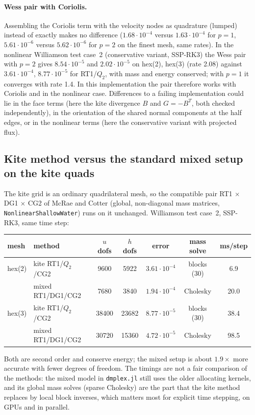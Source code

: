 \documentclass[11pt,a4paper]{article}
\newcommand{\code}[1]{\texttt{#1}}
\begin{document}
\paragraph{Wess pair with Coriolis.} Assembling the Coriolis term with the velocity
nodes as quadrature (lumped) instead of exactly makes no difference
($1.68\cdot10^{-4}$ versus $1.63\cdot10^{-4}$ for $p=1$, $5.61\cdot10^{-6}$ versus
$5.62\cdot10^{-6}$ for $p=2$ on the finest mesh, same rates). In the nonlinear
Williamson test case~2 (conservative variant, SSP-RK3) the Wess pair with $p=2$
gives $8.54\cdot10^{-5}$ and $2.02\cdot10^{-5}$ on hex(2), hex(3) (rate 2.08)
against $3.61\cdot10^{-4}$, $8.77\cdot10^{-5}$ for RT1/$Q_2$, with mass and energy
conserved; with $p=1$ it converges with rate 1.4. In this implementation the pair
therefore works with Coriolis and in the nonlinear case. Differences to a failing
implementation could lie in the face terms (here the kite divergence $B$ and
$G=-B^T$, both checked independently), in the orientation of the shared normal
components at the half edges, or in the nonlinear terms (here the conservative
variant with projected flux).

\subsection{Kite method versus the standard mixed setup on the kite quads}
The kite grid is an ordinary quadrilateral mesh, so the compatible pair
RT1 $\times$ DG1 $\times$ CG2 of McRae and Cotter (global, non-diagonal mass
matrices, \code{NonlinearShallowWater}) runs on it unchanged. Williamson test
case~2, SSP-RK3, same time step:
\begin{center}
\begin{tabular}{llccccc}
\toprule
mesh & method & $u$ dofs & $h$ dofs & error & mass solve & ms/step \\
\midrule
hex(2) & kite RT1/$Q_2$/CG2   &  9600 &  5922 & $3.61\cdot10^{-4}$ & blocks (30) & 6.9 \\
       & mixed RT1/DG1/CG2    &  7680 &  3840 & $1.94\cdot10^{-4}$ & Cholesky    & 20.0 \\
hex(3) & kite RT1/$Q_2$/CG2   & 38400 & 23682 & $8.77\cdot10^{-5}$ & blocks (30) & 38.4 \\
       & mixed RT1/DG1/CG2    & 30720 & 15360 & $4.72\cdot10^{-5}$ & Cholesky    & 98.5 \\
\bottomrule
\end{tabular}
\end{center}
Both are second order and conserve energy; the mixed setup is about $1.9\times$
more accurate with fewer degrees of freedom. The timings are not a fair
comparison of the methods: the mixed model in \code{dmplex.jl} still uses the
older allocating kernels, and its global mass solves (sparse Cholesky) are the
part that the kite method replaces by local block inverses, which matters most
for explicit time stepping, on GPUs and in parallel.
\end{document}
